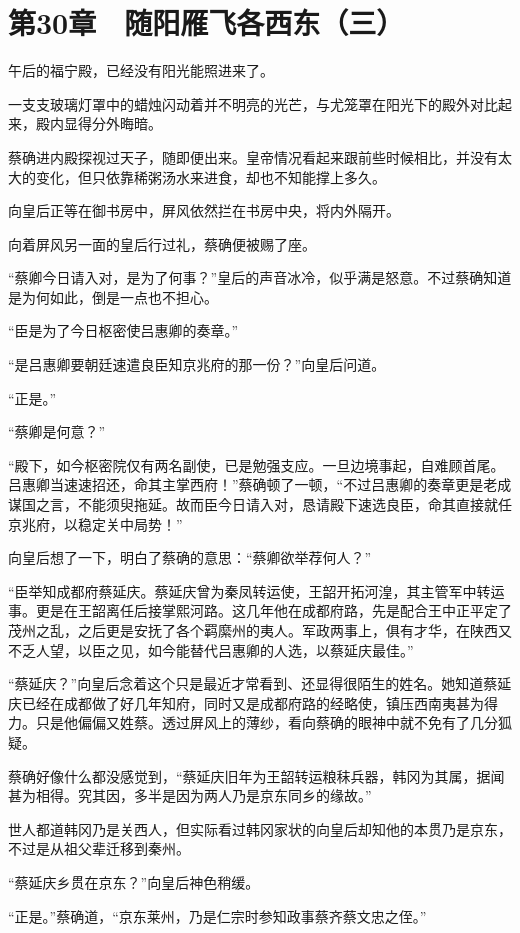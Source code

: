 \section{第30章　随阳雁飞各西东（三）}

午后的福宁殿，已经没有阳光能照进来了。

一支支玻璃灯罩中的蜡烛闪动着并不明亮的光芒，与尤笼罩在阳光下的殿外对比起来，殿内显得分外晦暗。

蔡确进内殿探视过天子，随即便出来。皇帝情况看起来跟前些时候相比，并没有太大的变化，但只依靠稀粥汤水来进食，却也不知能撑上多久。

向皇后正等在御书房中，屏风依然拦在书房中央，将内外隔开。

向着屏风另一面的皇后行过礼，蔡确便被赐了座。

“蔡卿今日请入对，是为了何事？”皇后的声音冰冷，似乎满是怒意。不过蔡确知道是为何如此，倒是一点也不担心。

“臣是为了今日枢密使吕惠卿的奏章。”

“是吕惠卿要朝廷速遣良臣知京兆府的那一份？”向皇后问道。

“正是。”

“蔡卿是何意？”

“殿下，如今枢密院仅有两名副使，已是勉强支应。一旦边境事起，自难顾首尾。吕惠卿当速速招还，命其主掌西府！”蔡确顿了一顿，“不过吕惠卿的奏章更是老成谋国之言，不能须臾拖延。故而臣今日请入对，恳请殿下速选良臣，命其直接就任京兆府，以稳定关中局势！”

向皇后想了一下，明白了蔡确的意思：“蔡卿欲举荐何人？”

“臣举知成都府蔡延庆。蔡延庆曾为秦凤转运使，王韶开拓河湟，其主管军中转运事。更是在王韶离任后接掌熙河路。这几年他在成都府路，先是配合王中正平定了茂州之乱，之后更是安抚了各个羁縻州的夷人。军政两事上，俱有才华，在陕西又不乏人望，以臣之见，如今能替代吕惠卿的人选，以蔡延庆最佳。”

“蔡延庆？”向皇后念着这个只是最近才常看到、还显得很陌生的姓名。她知道蔡延庆已经在成都做了好几年知府，同时又是成都府路的经略使，镇压西南夷甚为得力。只是他偏偏又姓蔡。透过屏风上的薄纱，看向蔡确的眼神中就不免有了几分狐疑。

蔡确好像什么都没感觉到，“蔡延庆旧年为王韶转运粮秣兵器，韩冈为其属，据闻甚为相得。究其因，多半是因为两人乃是京东同乡的缘故。”

世人都道韩冈乃是关西人，但实际看过韩冈家状的向皇后却知他的本贯乃是京东，不过是从祖父辈迁移到秦州。

“蔡延庆乡贯在京东？”向皇后神色稍缓。

“正是。”蔡确道，“京东莱州，乃是仁宗时参知政事蔡齐蔡文忠之侄。”

